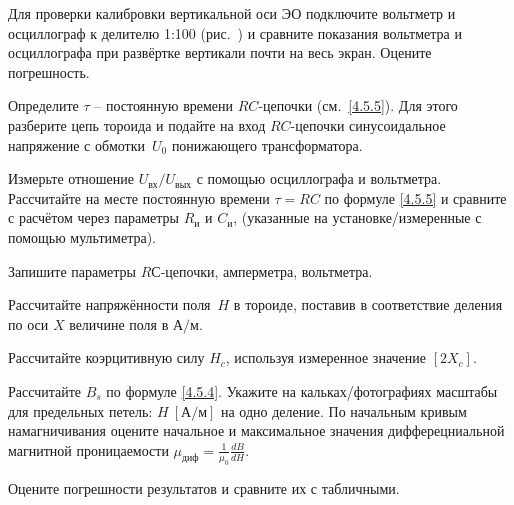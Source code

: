 \begin{lab:task}
\item
Для проверки калибровки вертикальной оси ЭО подключите вольтметр и осциллограф к
делителю 1:100 (рис.~) и сравните показания
вольтметра и осциллографа при развёртке вертикали почти на весь экран. Оцените
погрешность.


\item
Определите $\tau$ -- постоянную времени $RC$-цепочки (см.~\eqref{4.5.5}). Для
этого разберите цепь тороида и подайте на вход $RC$-цепочки синусоидальное напряжение
с обмотки~$U_0$ понижающего трансформатора.

\item
Измерьте отношение $U_\text{вх} / U_\text{вых}$ с помощью осциллографа и
вольтметра. Рассчитайте на месте постоянную времени $\tau=RC$ по формуле
\eqref{4.5.5} и сравните с расчётом через параметры $R_\text{и}$ и $C_\text{и}$,
(указанные на установке/измеренные с помощью мультиметра).

\item
Запишите параметры $RС$-цепочки, амперметра, вольтметра.



\item
Рассчитайте напряжённости поля~$H$ в тороиде, поставив в соответствие деления по
оси $X$ величине поля в $\text{А} / \text{м}$.

\item
Рассчитайте коэрцитивную силу $H_c$, используя измеренное значение $[2X_c]$.

\item
Рассчитайте $B_s$ по формуле \eqref{4.5.4}. Укажите на
кальках/фотографиях масштабы для предельных петель: $H~[\text{А} / \text{м}]$ на одно
деление. По начальным кривым намагничивания
оцените начальное и максимальное значения дифферецниальной
магнитной проницаемости $\mu_\text{диф}=\frac{1}{\mu_0}\frac{dB}{dH}$.

\item
Оцените погрешности результатов и сравните их с табличными.

\end{lab:task}

